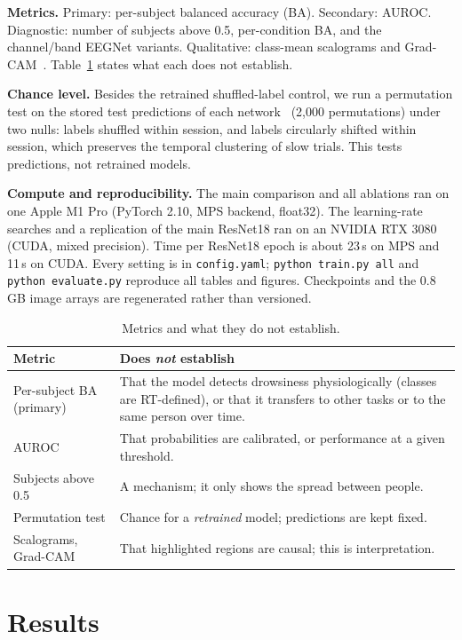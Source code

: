 \documentclass[conference]{IEEEtran}
\begin{document}
\textbf{Metrics.} Primary: per-subject balanced accuracy (BA). Secondary: AUROC. Diagnostic: number of subjects above 0.5, per-condition BA, and the channel/band EEGNet variants. Qualitative: class-mean scalograms and Grad-CAM~\cite{selvaraju2017}. Table~\ref{tab:metrics} states what each does not establish.

\textbf{Chance level.} Besides the retrained shuffled-label control, we run a permutation test on the stored test predictions of each network~\cite{ojala2010} (2{,}000 permutations) under two nulls: labels shuffled within session, and labels circularly shifted within session, which preserves the temporal clustering of slow trials. This tests predictions, not retrained models.

\textbf{Compute and reproducibility.} The main comparison and all ablations ran on one Apple M1 Pro (PyTorch 2.10, MPS backend, float32). The learning-rate searches and a replication of the main ResNet18 ran on an NVIDIA RTX 3080 (CUDA, mixed precision). Time per ResNet18 epoch is about 23\,s on MPS and 11\,s on CUDA. Every setting is in \texttt{config.yaml}; \texttt{python train.py all} and \texttt{python evaluate.py} reproduce all tables and figures. Checkpoints and the 0.8\,GB image arrays are regenerated rather than versioned.

\begin{table}[t]
\centering
\caption{Metrics and what they do not establish.}
\label{tab:metrics}
\footnotesize
\begin{tabular}{@{}p{}p{}@{}}
\toprule
Metric & Does \emph{not} establish \\
\midrule
Per-subject BA (primary) & That the model detects drowsiness physiologically (classes are RT-defined), or that it transfers to other tasks or to the same person over time. \\
AUROC & That probabilities are calibrated, or performance at a given threshold. \\
Subjects above 0.5 & A mechanism; it only shows the spread between people. \\
Permutation test & Chance for a \emph{retrained} model; predictions are kept fixed. \\
Scalograms, Grad-CAM & That highlighted regions are causal; this is interpretation. \\
\bottomrule
\end{tabular}
\end{table}

\section{Results}
\begin{table}[t]
\centering
\caption{Performance on unseen subjects. BA and AUROC: mean $\pm$ SD over 15 runs (5 folds $\times$ 3 seeds). Per-subject BA: mean over 24 subjects (seeds averaged), with 95\% subject-bootstrap CI. Main comparison in bold.}
\label{tab:main}
\small

\end{table}
\end{document}
